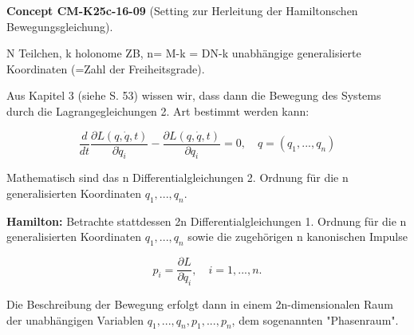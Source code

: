 \documentclass[10pt, letterpaper]{article}
\newcommand{\CustomHeading}[3]{%
  \par\medskip\noindent%
  \textbf{#1 #2} \textnormal{(#3)}.\enskip%
}
\newenvironment{CONC}[2]{\CustomHeading{Concept}{#1}{#2}}{}
\begin{document}
\begin{CONC}{CM-K25c-16-09}{Setting zur Herleitung der Hamiltonschen Bewegungsgleichung}
N Teilchen, k holonome ZB, n= M-k = DN-k unabhängige generalisierte Koordinaten (=Zahl der Freiheitsgrade).

Aus Kapitel 3 (siehe S. 53) wissen wir, dass dann die Bewegung des Systems durch die Lagrangegleichungen 2. Art bestimmt werden kann:

\[
\frac{d}{dt} \frac{\partial L(q,\dot{q},t)}{\partial \dot{q}_i} - \frac{\partial L(q,\dot{q},t)}{\partial q_i} = 0, \quad q=(q_1,...,q_n)
\]

Mathematisch sind das n Differentialgleichungen 2. Ordnung für die n generalisierten Koordinaten $q_1,...,q_n$.

\textbf{Hamilton:} Betrachte stattdessen 2n Differentialgleichungen 1. Ordnung für die n generalisierten Koordinaten $q_1,...,q_n$ sowie die zugehörigen n kanonischen Impulse

\[
p_i = \frac{\partial L}{\partial \dot{q}_i}, \quad i=1,...,n.
\]

Die Beschreibung der Bewegung erfolgt dann in einem 2n-dimensionalen Raum der unabhängigen Variablen $q_1,...,q_n,p_1,...,p_n$, dem sogenannten "Phasenraum".
\end{CONC}
\end{document}
